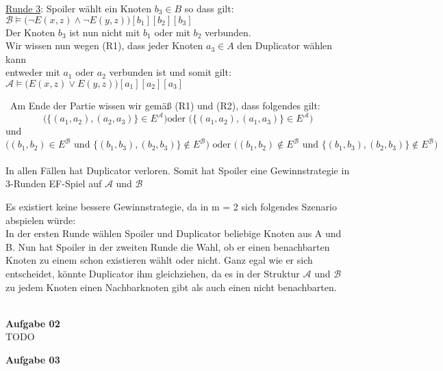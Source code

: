 \documentclass[a4paper,10pt]{article}
\begin{document}
\begin{compactenum} [(a)]
\begin{tabbing}
			\underline{Runde 3}: Spoiler wählt ein Knoten $ b_3 \in B $ so dass gilt:\\
			\> $ \mathcal{B} \models \big(\lnot E(x,z) \wedge \lnot E(y,z)\big) [b_1][b_2][b_3] $\\
			\> Der Knoten $ b_3 $ ist nun nicht mit $ b_1 $ oder mit $ b_2 $ verbunden.\\
			\> Wir wissen nun wegen (R1), dass jeder Knoten $ a_3 \in A $ den Duplicator wählen kann \\
			\> entweder mit $ a_1 $ oder $ a_2 $ verbunden ist und somit gilt: \\
			\> $\mathcal{A} \models \big(E(x,z) \vee E(y,z)\big) [a_1][a_2][a_3]$\\
		\end{tabbing}\
		Am Ende der Partie wissen wir gemäß (R1) und (R2), dass folgendes gilt:\\
		\[ \big(\{(a_1,a_2),(a_2,a_3)\}\in E^\mathcal{A}\big)  \text{oder } \big(\{(a_1,a_2),(a_1,a_3)\}\in E^\mathcal{A}\big) \] 
		und\\
		\[ \big((b_1,b_2)\in E^\mathcal{B} \text{ und } \{(b_1,b_3),(b_2,b_3)\} \not\in E^\mathcal{B}\big) \text{ oder }  \big((b_1,b_2)\not\in E^\mathcal{B} \text{ und } \{(b_1,b_3),(b_2,b_3)\} \not\in E^\mathcal{B}\big) \]\\
		
		In allen Fällen hat Duplicator verloren. Somit hat Spoiler eine Gewinnstrategie in 3-Runden EF-Spiel auf $\mathcal{A}$ und $\mathcal{B}$\\
		
		\item Es existiert keine bessere Gewinnstrategie, da in m = 2 sich folgendes Szenario abspielen würde:\\
		In der ersten Runde wählen Spoiler und Duplicator beliebige Knoten aus A und B. Nun hat Spoiler in der zweiten Runde die Wahl, ob er einen benachbarten Knoten zu einem schon existieren wählt oder nicht. Ganz egal wie er sich entscheidet, könnte Duplicator ihm gleichziehen, da es in der Struktur $ \mathcal{A} $ und $ \mathcal{B} $ zu jedem Knoten einen Nachbarknoten gibt als auch einen nicht benachbarten. 
	\end{compactenum}\ \\
	
	\textbf{Aufgabe 02}\\
	TODO
	
	\newpage

	\textbf{Aufgabe 03}\\
	
\end{document}
